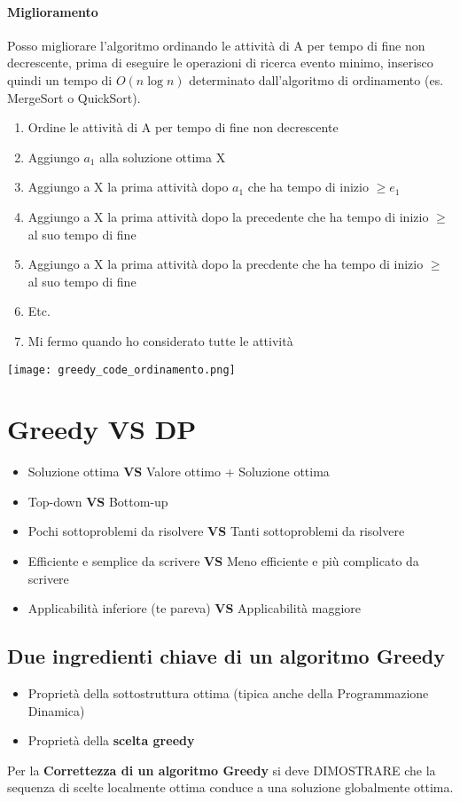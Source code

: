 \paragraph*{Miglioramento} Posso migliorare l'algoritmo ordinando le attività di A per tempo di fine
non decrescente, prima di eseguire le operazioni di ricerca evento minimo, inserisco quindi un
tempo di $O(n\log n)$ determinato dall'algoritmo di ordinamento (es. MergeSort o QuickSort).\\
\begin{enumerate}
    \item Ordine le attività di A per tempo di fine non decrescente
    \item Aggiungo $a_1$ alla soluzione ottima X
    \item Aggiungo a X la prima attività dopo $a_1$ che ha tempo di inizio $\geq e_1$
    \item Aggiungo a X la prima attività dopo la precedente che ha tempo di inizio $\geq$ al suo
    tempo di fine
    \item Aggiungo a X la prima attività dopo la precdente che ha tempo di inizio $\geq$ al suo tempo
    di fine
    \item Etc.
    \item Mi fermo quando ho considerato tutte le attività
\end{enumerate}
\begin{center}
    \texttt{[image: greedy\_code\_ordinamento.png]}
\end{center}
\section{Greedy VS DP}
\begin{itemize}
    \item Soluzione ottima \textbf{VS} Valore ottimo + Soluzione ottima
    \item Top-down \textbf{VS} Bottom-up
    \item Pochi sottoproblemi da risolvere \textbf{VS} Tanti sottoproblemi da risolvere
    \item Efficiente e semplice da scrivere \textbf{VS} Meno efficiente e più complicato da scrivere
    \item Applicabilità inferiore (te pareva) \textbf{VS} Applicabilità maggiore
\end{itemize}
\subsection{Due ingredienti chiave di un algoritmo Greedy}
\begin{itemize}
    \item Proprietà della sottostruttura ottima (tipica anche della Programmazione Dinamica)
    \item Proprietà della \textbf{scelta greedy}
\end{itemize}
Per la \textbf{Correttezza di un algoritmo Greedy} si deve DIMOSTRARE che la sequenza di scelte
localmente ottima conduce a una soluzione globalmente ottima.\\
